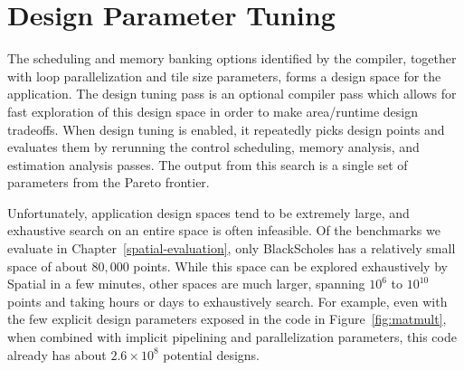 
\section{Design Parameter Tuning}
\label{dse}

The scheduling and memory banking options identified by the compiler, together with loop parallelization and tile size parameters, forms a design space for the application.
The design tuning pass is an optional compiler pass which allows for fast exploration of this design space in order to make area/runtime design tradeoffs.
When design tuning is enabled, it repeatedly picks design points and evaluates them by rerunning the control scheduling, memory analysis, and estimation analysis passes. The output from this search is a single set of parameters from the Pareto frontier.

Unfortunately, application design spaces tend to be extremely large, and exhaustive search on an entire space is often infeasible. Of the benchmarks we evaluate in Chapter~\ref{spatial-evaluation},
only BlackScholes has a relatively small space of about $80,000$ points. While this space can be explored exhaustively by Spatial in a few minutes, other spaces are much larger, spanning $10^6$ to $10^{10}$ points and
taking hours or days to exhaustively search. For example, even with the few explicit design parameters exposed in the code in Figure~\ref{fig:matmult}, when combined with implicit pipelining and parallelization parameters, this code already has about $2.6\times10^8$ potential designs.

